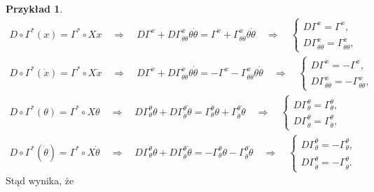 \documentclass[11pt,a4paper]{report}
\theoremstyle{definition}
\newtheorem{example}[theorem]{Przykład}
\begin{document}
\begin{example}
\begin{equation*}
\begin{gathered}
D\circ\Gamma^*(x)=\Gamma^*\circ Xx\quad \Longrightarrow\quad D\Gamma^x+D\Gamma^x_{\theta\dot\theta}\theta\dot\theta =\Gamma^{\dot x}+\Gamma^{\dot x}_{\theta\dot\theta}\theta\dot\theta\quad \Longrightarrow\quad \left\{ \begin{array}{l}
      D\Gamma^x=\Gamma^{\dot x}, \\
      D\Gamma_{\theta\dot\theta}^x=\Gamma_{\theta\dot\theta}^{\dot x}, \end{array} \right. \\
D\circ \Gamma^*(\dot x) =\Gamma^*\circ X\dot x\quad \Longrightarrow\quad D\Gamma^{\dot x}+D\Gamma^{\dot x}_{\theta\dot\theta}\theta\dot\theta =-\Gamma^{x}-\Gamma^{x}_{\theta\dot\theta} \theta \dot \theta \quad \Longrightarrow\quad \left\{ \begin{array}{l}
      D\Gamma^{\dot x}=-\Gamma^{x}, \\
      D\Gamma_{\theta\dot\theta}^{\dot x} = -\Gamma_{\theta \dot \theta}^{x}, \end{array} \right. \\
D\circ \Gamma^*(\theta)=\Gamma^*\circ X\theta\quad \Longrightarrow\quad  D\Gamma^\theta_\theta\theta+D\Gamma^\theta_{\dot\theta}\dot\theta =\Gamma^{\dot \theta}_{\theta}\theta+\Gamma^{\dot \theta}_{\dot\theta}\dot \theta\quad \Longrightarrow\quad \left\{ \begin{array}{l}
      D\Gamma^\theta_\theta=\Gamma^{\dot\theta}_\theta, \\
      D\Gamma^\theta_{\dot\theta}=\Gamma^{\theta}_{\dot\theta}, \end{array} \right. \\
D\circ \Gamma^*(\dot \theta)=\Gamma^*\circ X\dot \theta\quad \Longrightarrow\quad D\Gamma^{\dot \theta}_\theta\theta+D\Gamma^{\dot \theta}_{\dot\theta}\dot \theta=-\Gamma^{\theta}_\theta\theta-\Gamma^{\theta}_{\dot\theta}\dot\theta\quad \Longrightarrow\quad \left\{ \begin{array}{l}
      D\Gamma^{\dot \theta}_\theta=-\Gamma^{\theta}_\theta, \\
      D\Gamma^{\dot\theta}_{\dot \theta}=-\Gamma_{\dot\theta}^{\theta}. \end{array} \right.
\end{gathered}
\end{equation*}
Stąd wynika, że
\begin{equation}
\label{eq:superflow_coeff_conditions}
\begin{gathered}

\end{gathered}
\end{equation}
\end{example}
\end{document}
